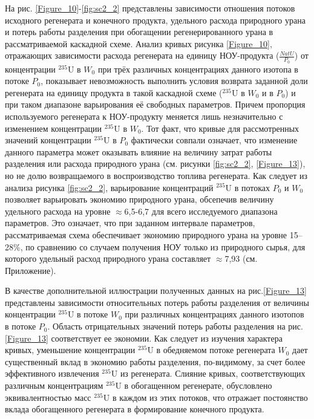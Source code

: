 На рис. \ref{Figure_10}-\ref{fig:sc2_2} представлены зависимости отношения потоков исходного регенерата и конечного продукта, удельного расхода природного урана и потерь работы разделения при обогащении регенерированного урана в рассматриваемой каскадной схеме. 
Анализ кривых рисунка \ref{Figure_10}, отражающих зависимости расхода регенерата на единицу НОУ-продукта ($\frac{NatU}{P_{0}}$) от концентрации $^{235}$U в $W_0$ при трёх различных концентрациях данного изотопа в потоке $P_0$, показывает невозможность выполнить условия возврата заданной доли регенерата на единицу продукта в такой каскадной схеме ($^{235}$U в $W_0$ и в $P_0$) и при таком диапазоне варьирования её свободных параметров. Причем пропорция используемого регенерата к НОУ-продукту меняется лишь незначительно с изменением концентрации $^{235}$U в $W_0$. Тот факт, что кривые для рассмотренных значений концентрации $^{235}$U в $P_0$ фактически совпали означает, что изменение данного параметра может оказывать влияние на величину затрат работы разделения или расхода природного урана (см. рисунки \ref{fig:sc2_2}, \ref{Figure_13}), но не долю возвращаемого в воспроизводство топлива регенерата.
Как следует из анализа рисунка \ref{fig:sc2_2}, варьирование концентраций $^{235}$U в потоках $P_0$ и $W_0$ позволяет варьировать экономию природного урана, обсепечив величину удельного расхода на уровне $\approx$6,5-6,7 для всего исследуемого диапазона параметров. Это означает, что при заданном интервале параметров, рассматриваемая схема обеспечивает экономию природного урана на уровне 15--28\%, по сравнению со случаем получения НОУ только из природного сырья, для которого удельный расход природного урана составляет $\approx$7,93 (см. Приложение).

В качестве дополнительной иллюстрации полученных данных на рис.\ref{Figure_13} представлены зависимости относительных потерь работы разделения от величины концентрации $^{235}$U в потоке $W_0$ при различных концентрациях данного изотопов в потоке $P_0$. Область отрицательных значений потерь работы разделения на рис. \ref{Figure_13} соответствует ее экономии. Как следует из изучения характера кривых, уменьшение концентрации $^{235}$U в обедняемом потоке регенерата $W_0$ дает существенный вклад в экономию работы разделения, по-видимому, за счет более эффективного извлечения $^{235}$U из регенерата. Слияние кривых, соответствующих различным концентрациям $^{235}$U в обогащенном регенерате, обусловлено эквивалентностью масс $^{235}$U в каждом из этих потоков, что отражает постоянство вклада обогащенного регенерата в формирование конечного продукта.

